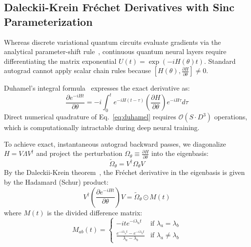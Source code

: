 \documentclass[10pt,twocolumn,3p]{article}
\begin{document}
\subsection{Daleckii-Krein Fr\'echet Derivatives with Sinc Parameterization}
\label{subsec:daleckii_krein}

Whereas discrete variational quantum circuits evaluate gradients via the analytical parameter-shift rule~\cite{mitarai2018,schuld2019}, continuous quantum neural layers require differentiating the matrix exponential $U(t) = \exp(-i H(\theta) t)$. Standard autograd cannot apply scalar chain rules because $[H(\theta), \frac{\partial H}{\partial \theta}] \neq 0$.

Duhamel's integral formula~\cite{wilcox1967} expresses the exact derivative as:
\begin{equation}
    \frac{\partial e^{-i H t}}{\partial \theta} = -i \int_0^t e^{-i H (t - \tau)} \left( \frac{\partial H}{\partial \theta} \right) e^{-i H \tau} d\tau
    \label{eq:duhamel}
\end{equation}
Direct numerical quadrature of Eq.~\eqref{eq:duhamel} requires $\mathcal{O}(S \cdot D^3)$ operations, which is computationally intractable during deep neural training.

To achieve exact, instantaneous autograd backward passes, we diagonalize $H = V \Lambda V^\dagger$ and project the perturbation $\Omega_\theta \equiv \frac{\partial H}{\partial \theta}$ into the eigenbasis:
\begin{equation}
    \tilde{\Omega}_\theta = V^\dagger \Omega_\theta V
\end{equation}
By the Daleckii-Krein theorem~\cite{daleckii1965,bhatia1997}, the Fr\'echet derivative in the eigenbasis is given by the Hadamard (Schur) product:
\begin{equation}
    V^\dagger \left( \frac{\partial e^{-i H t}}{\partial \theta} \right) V = \tilde{\Omega}_\theta \odot M(t)
    \label{eq:schur_dk}
\end{equation}
where $M(t)$ is the divided difference matrix:
\begin{equation}
    M_{ab}(t) = \begin{cases} -i t e^{-i \lambda_a t} & \text{if } \lambda_a = \lambda_b \\ \frac{e^{-i \lambda_a t} - e^{-i \lambda_b t}}{\lambda_a - \lambda_b} & \text{if } \lambda_a \neq \lambda_b \end{cases}
    \label{eq:naive_M}
\end{equation}
\end{document}

